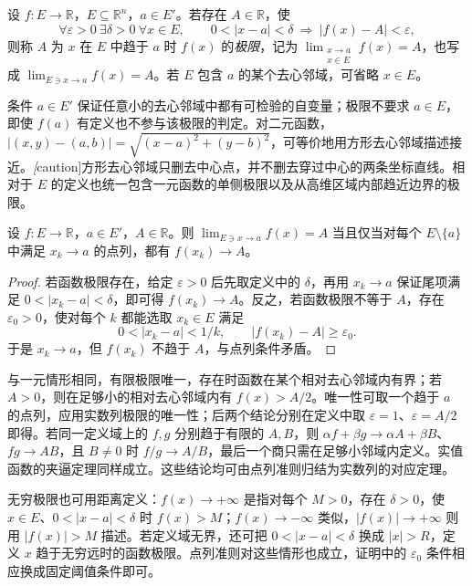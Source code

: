\documentclass[UTF8,12pt,a4paper,fontset=fandol]{ctexbook}
\begin{document}
\begin{definition}
\label{def:multivariable-function-limit}
设 $f:E\to\mathbb R$，$E\subseteq\mathbb R^n$，$a\in E'$。若存在 $A\in\mathbb R$，使
\[
    \forall\varepsilon>0\ \exists\delta>0\ \forall x\in E,
    \qquad 0<|x-a|<\delta\ \Longrightarrow\ |f(x)-A|<\varepsilon,
\]
则称 $A$ 为 $x$ 在 $E$ 中趋于 $a$ 时 $f(x)$ 的\emph{极限}，记为 $\lim_{\substack{x\to a\\ x\in E}}f(x)=A$，也写成 $\lim_{E\ni x\to a}f(x)=A$。若 $E$ 包含 $a$ 的某个去心邻域，可省略 $x\in E$。
\end{definition}

条件 $a\in E'$ 保证任意小的去心邻域中都有可检验的自变量；极限不要求 $a\in E$，即使 $f(a)$ 有定义也不参与该极限的判定。对二元函数，$|(x,y)-(a,b)|=\sqrt{(x-a)^2+(y-b)^2}$，可等价地用方形去心邻域描述接近。\emph[caution]{方形去心邻域只删去中心点，并不删去穿过中心的两条坐标直线。}相对于 $E$ 的定义也统一包含一元函数的单侧极限以及从高维区域内部趋近边界的极限。

\begin{theorem}[多元函数极限的点列准则]
\label{thm:multivariable-heine-criterion}
设 $f:E\to\mathbb R$，$a\in E'$，$A\in\mathbb R$。则 $\lim_{E\ni x\to a}f(x)=A$ 当且仅当对每个 $E\setminus\{a\}$ 中满足 $x_k\to a$ 的点列，都有 $f(x_k)\to A$。
\end{theorem}

\begin{proof}
若函数极限存在，给定 $\varepsilon>0$ 后先取定义中的 $\delta$，再用 $x_k\to a$ 保证尾项满足 $0<|x_k-a|<\delta$，即可得 $f(x_k)\to A$。反之，若函数极限不等于 $A$，存在 $\varepsilon_0>0$，使对每个 $k$ 都能选取 $x_k\in E$ 满足
\[
    0<|x_k-a|<1/k,\qquad |f(x_k)-A|\geq\varepsilon_0.
\]
于是 $x_k\to a$，但 $f(x_k)$ 不趋于 $A$，与点列条件矛盾。
\end{proof}

与一元情形相同，有限极限唯一，存在时函数在某个相对去心邻域内有界；若 $A>0$，则在足够小的相对去心邻域内有 $f(x)>A/2$。唯一性可取一个趋于 $a$ 的点列，应用实数列极限的唯一性；后两个结论分别在定义中取 $\varepsilon=1$、$\varepsilon=A/2$ 即得。若同一定义域上的 $f,g$ 分别趋于有限的 $A,B$，则 $\alpha f+\beta g\to\alpha A+\beta B$、$fg\to AB$，且 $B\neq0$ 时 $f/g\to A/B$，最后一个商只需在足够小邻域内定义。实值函数的夹逼定理同样成立。这些结论均可由点列准则归结为实数列的对应定理。

无穷极限也可用距离定义：$f(x)\to+\infty$ 是指对每个 $M>0$，存在 $\delta>0$，使 $x\in E$、$0<|x-a|<\delta$ 时 $f(x)>M$；$f(x)\to-\infty$ 类似，$|f(x)|\to+\infty$ 则用 $|f(x)|>M$ 描述。若定义域无界，还可把 $0<|x-a|<\delta$ 换成 $|x|>R$，定义 $x$ 趋于无穷远时的函数极限。点列准则对这些情形也成立，证明中的 $\varepsilon_0$ 条件相应换成固定阈值条件即可。
\end{document}
